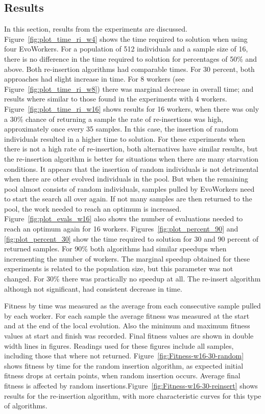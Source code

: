 \documentclass{sig-alternate}
\begin{document}
\subsection{Results}
In this section, results from the experiments are discussed. 
Figure~\ref{fig:plot_time_ri_w4} shows the time required 
to solution when using four EvoWorkers. For a population of
512 individuals and a sample size of 16, there is no
difference in the time required to solution for 
percentages of 50\% and above. Both re-insertion algorithms
had comparable times. For 30 percent, both approaches 
had slight increase in time. For 8 workers 
(see Figure~\ref{fig:plot_time_ri_w8})  there was marginal
decrease in overall time; and results where 
similar to those found in the experiments with 4 workers.  
Figure~\ref{fig:plot_time_ri_w16} shows results for 16 workers,
when there was only a 30\% chance of returning a sample 
the rate of re-insertions was high, approximately once every 35
samples. In this case, the insertion of random individuals 
resulted in a higher time to solution. For these experiments
when there is not a high rate of re-insertion, both alternatives
have similar results, but the re-insertion algorithm is better
for situations when there are many starvation conditions. It appears
that the insertion of random individuals is not detrimental when there
are other evolved individuals in the pool. But when the remaining
pool almost consists of random individuals, samples pulled by
EvoWorkers need to start the search all over again. 
If not many samples are then returned to the pool, the work needed to reach an
optimum is increased. Figure~\ref{fig:plot_evals_w16} also shows the number 
of evaluations needed to reach an optimum again for 16 workers.
Figures~\ref{fig:plot_percent_90} and \ref{fig:plot_percent_30} show
the time required to solution for 30 and 90 percent of returned samples.
For 90\% both algorithms had similar speedups when incrementing the number of
workers. The marginal speedup obtained for these experiments is related to 
the population size, but this parameter was not changed. For 30\% 
there was practically no speedup at all. The re-insert algorithm
although not significant, had consistent decrease in time.         

Fitness by time was measured as the average from each consecutive
sample pulled by each worker. For each sample the average fitness
was measured at the start and at the end of the local evolution.
Also the minimum and maximum fitness values at start and finish was 
recorded. Final fitness values are shown in double width lines in figures.
Readings used for these figures include all samples, including
those that where not returned.   
Figure~\ref{fig:Fitness-w16-30-random} shows fitness by time
for the random insertion algorithm, as expected initial fitness drops
at certain points, when random insertion occurs. Average final fitness 
is affected by random insertions.Figure~\ref{fig:Fitness-w16-30-reinsert}
shows results for the re-insertion algorithm, with more
characteristic curves for this type of algorithms. 
 
\end{document}
